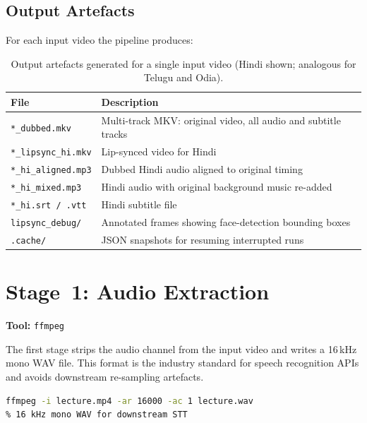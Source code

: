 \documentclass[12pt,a4paper]{article}
\begin{document}
\subsection{Output Artefacts}

For each input video the pipeline produces:

\begin{table}[H]
\centering
\begin{tabularx}{\linewidth}{lX}
\toprule
\textbf{File} & \textbf{Description} \\
\midrule
\texttt{*\_dubbed.mkv}         & Multi-track MKV: original video, all audio and subtitle tracks \\
\texttt{*\_lipsync\_hi.mkv}    & Lip-synced video for Hindi \\
\texttt{*\_hi\_aligned.mp3}    & Dubbed Hindi audio aligned to original timing \\
\texttt{*\_hi\_mixed.mp3}      & Hindi audio with original background music re-added \\
\texttt{*\_hi.srt / .vtt}      & Hindi subtitle file \\
\texttt{lipsync\_debug/}       & Annotated frames showing face-detection bounding boxes \\
\texttt{.cache/}               & JSON snapshots for resuming interrupted runs \\
\bottomrule
\end{tabularx}
\caption{Output artefacts generated for a single input video (Hindi shown; analogous for Telugu and Odia).}
\end{table}

\section{Stage~1: Audio Extraction}

\textbf{Tool:} \texttt{ffmpeg}

The first stage strips the audio channel from the input video and writes a
16\,kHz mono WAV file.  This format is the industry standard for speech
recognition APIs and avoids downstream re-sampling artefacts.

\begin{lstlisting}[language=bash]
ffmpeg -i lecture.mp4 -ar 16000 -ac 1 lecture.wav
% 16 kHz mono WAV for downstream STT
\end{lstlisting}
\end{document}
